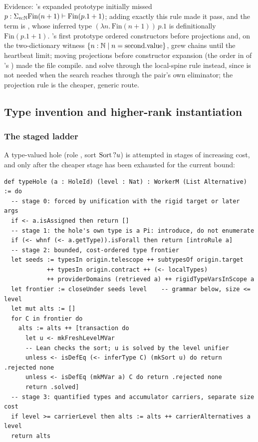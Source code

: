 Evidence: 's expanded prototype initially missed $p : \Sigma_{n:\mathbb{N}}\mathrm{Fin}(n+1) \vdash \mathrm{Fin}(p.1+1)$; adding exactly this rule made it pass, and the term is , whose inferred type $(\lambda n.\,\mathrm{Fin}(n+1))\,p.1$ is definitionally $\mathrm{Fin}(p.1+1)$. 's first prototype ordered constructors before projections and, on the two-dictionary witness $\{n:\mathbb{N} \mid n = \mathrm{second.value}\}$, grew  chains until the heartbeat limit; moving projections before constructor expansion (the order in  of 's ) made the file compile.  and  solve  through the local-spine rule instead, since  is not needed when the search reaches  through the pair's own eliminator; the projection rule is the cheaper, generic route.

\subsection{Type invention and higher-rank instantiation}\label{alg:types}

\subsubsection{The staged ladder}

A type-valued hole (role , sort $\mathrm{Sort}\,?u$) is attempted in stages of increasing cost, and only after the cheaper stage has been exhausted for the current bound:

\begin{lstlisting}
def typeHole (a : HoleId) (level : Nat) : WorkerM (List Alternative) := do
  -- stage 0: forced by unification with the rigid target or later args
  if <- a.isAssigned then return []
  -- stage 1: the hole's own type is a Pi: introduce, do not enumerate
  if (<- whnf (<- a.getType)).isForall then return [introRule a]
  -- stage 2: bounded, cost-ordered type frontier
  let seeds := typesIn origin.telescope ++ subtypesOf origin.target
            ++ typesIn origin.contract ++ (<- localTypes)
            ++ providerDomains (retrieved a) ++ rigidTypeVarsInScope a
  let frontier := closeUnder seeds level    -- grammar below, size <= level
  let mut alts := []
  for C in frontier do
    alts := alts ++ [transaction do
      let u <- mkFreshLevelMVar
      -- Lean checks the sort; u is solved by the level unifier
      unless <- isDefEq (<- inferType C) (mkSort u) do return .rejected none
      unless <- isDefEq (mkMVar a) C do return .rejected none
      return .solved]
  -- stage 3: quantified types and accumulator carriers, separate size cost
  if level >= carrierLevel then alts := alts ++ carrierAlternatives a level
  return alts
\end{lstlisting}

